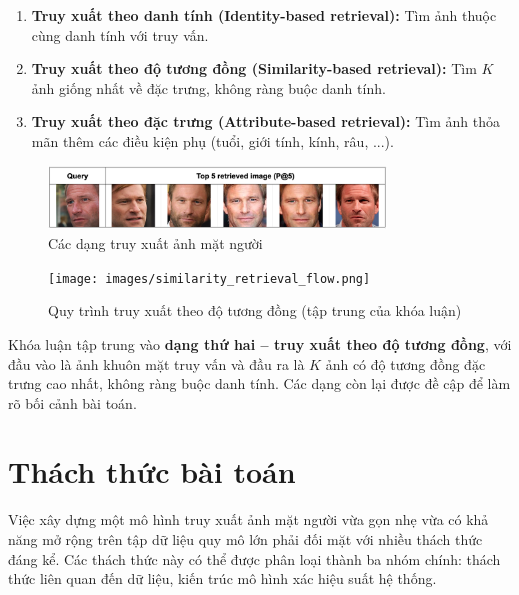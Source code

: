 \begin{enumerate}
    \item \textbf{Truy xuất theo danh tính (Identity-based retrieval):} Tìm ảnh thuộc cùng danh tính với truy vấn.
    \item \textbf{Truy xuất theo độ tương đồng (Similarity-based retrieval):} Tìm \( K \) ảnh giống nhất về đặc trưng, không ràng buộc danh tính.
    \item \textbf{Truy xuất theo đặc trưng (Attribute-based retrieval):} Tìm ảnh thỏa mãn thêm các điều kiện phụ (tuổi, giới tính, kính, râu, ...).
\end{enumerate}

\begin{figure}[htbp]
    \centering
    \includegraphics[width=0.8\textwidth]{images/face_retrieval_types.png} 
    \caption{Các dạng truy xuất ảnh mặt người}
    \label{fig:face_retrieval_types}
\end{figure}

\begin{figure}[htbp]
    \centering
    \texttt{[image: images/similarity\_retrieval\_flow.png]}
    \caption{Quy trình truy xuất theo độ tương đồng (tập trung của khóa luận)}
    \label{fig:similarity_flow}
\end{figure}

Khóa luận tập trung vào \textbf{dạng thứ hai – truy xuất theo độ tương đồng}, với đầu vào là ảnh khuôn mặt truy vấn và đầu ra là \( K \) ảnh có độ tương đồng đặc trưng cao nhất, không ràng buộc danh tính. Các dạng còn lại được đề cập để làm rõ bối cảnh bài toán.

\section{Thách thức bài toán}
Việc xây dựng một mô hình truy xuất ảnh mặt người vừa gọn nhẹ vừa có khả năng mở rộng trên tập dữ liệu quy mô lớn phải đối mặt với nhiều thách thức đáng kể. Các thách thức này có thể được phân loại thành ba nhóm chính: thách thức liên quan đến dữ liệu, kiến trúc mô hình xác hiệu suất hệ thống. 

